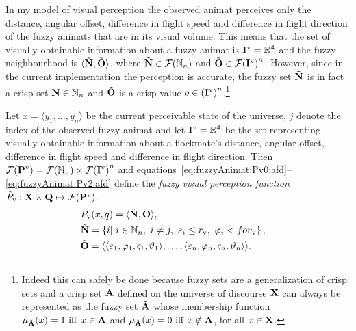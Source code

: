 In my model of visual perception the observed animat perceives only the distance, angular offset, difference in flight speed and difference in flight direction of the fuzzy animats that are in its visual volume. This means that the set of visually obtainable information about a fuzzy animat is ${\mathbf{I}}^\mathrm{v}=\mathbb{R}^4$ and the fuzzy neighbourhood is $\langle{\ensuremath{\tilde{{\mathbf{N}}}}},{\tilde{{\mathbf{O}}}}\rangle$, where ${\tilde{{\mathbf{N}}}} \in {\ensuremath{\mathcal{F}(\mathbb{N}_n)}}$ and ${\tilde{{\mathbf{O}}}} \in {\ensuremath{\mathcal{F}({\mathbf{I}}^\mathrm{v})}}^n$. However, since in the current implementation the perception is accurate, the fuzzy set ${\tilde{{\mathbf{N}}}}$ is in fact a crisp set ${\mathbf{N}} \in \mathbb{N}_n$ and ${\tilde{{\mathbf{O}}}}$ is a crisp value $o \in {({\ensuremath{\mathbf{I}}}^\mathrm{v})}^n$.\footnote{Indeed this can safely be done because fuzzy sets are a generalization of crisp sets and a crisp set ${\mathbf{A}}$ defined on the universe of discourse ${\mathbf{X}}$ can always be represented as the fuzzy set ${\tilde{{\mathbf{A}}}}$ whose membership function $\mu_{\tilde{{\mathbf{A}}}}(x)=1\ \mathrm{iff}\ x \in {\ensuremath{\mathbf{A}}}$ and $\mu_{\tilde{{\mathbf{A}}}}(x)=0\ \mathrm{iff}\ x \notin {\ensuremath{\mathbf{A}}}$, for all $x \in {\ensuremath{\mathbf{X}}}$.}

\begin{defn}
\label{def:fuzzyAnimat:Pv:afd}
Let $x=\langle y_1,\ldots,y_n\rangle$ be the current perceivable state of the universe, $j$ denote the index of the observed fuzzy animat and let ${\mathbf{I}}^\mathrm{v}=\mathbb{R}^4$ be the set representing visually obtainable information about a flockmate's distance, angular offset, difference in flight speed and difference in flight direction. Then ${\mathcal{F}({\mathbf{P}}^\mathrm{v})}={\mathcal{F}(\mathbb{N}_n)} \times {\ensuremath{\mathcal{F}({\mathbf{I}}^\mathrm{v})}}^n$ and equations~\eqref{eq:fuzzyAnimat:Pv0:afd}--\eqref{eq:fuzzyAnimat:Pv2:afd} define the \emph{fuzzy visual perception function} ${\tilde{P}}_\mathrm{v}: {\mathbf{X}} \times {\ensuremath{\mathbf{Q}}} \mapsto {\ensuremath{\mathcal{F}({\mathbf{P}}^\mathrm{v})}}$.
\begin{eqnarray}
& \ffunc{P}_\mathrm{v}(x,q)=\langle\fset{N},\fset{O}\rangle, & \label{eq:fuzzyAnimat:Pv0:afd} \\
& \fset{N}=\left\{i|\ i \in \N_n,\ i \neq j,\ \varepsilon_i%
 \leq r_\mathrm{v},\ \varphi_i%
 < \fov_\mathrm{v} \right\}, & \\ 
& \fset{O}=\langle \langle \varepsilon_1, \varphi_1, \varsigma_1, \vartheta_1 \rangle, \ldots,
\langle \varepsilon_n, \varphi_n, \varsigma_n, \vartheta_n \rangle \rangle. & \label{eq:fuzzyAnimat:Pv2:afd}
\end{eqnarray}
\end{defn}
 
